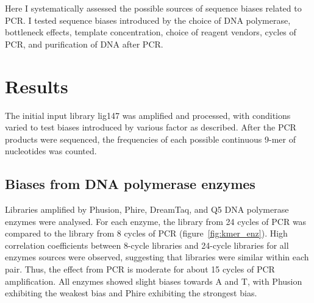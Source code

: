 \documentclass[a4paper, numbers=noenddot]{scrbook}
\begin{document}
Here I systematically assessed the possible sources of sequence biases related to PCR.  I tested sequence biases introduced by the choice of DNA polymerase, bottleneck effects, template concentration, choice of reagent vendors, cycles of PCR, and purification of DNA after PCR.

\section{Results}
\label{sec:pcrbias_results}

The initial input library lig147 was amplified and processed, with conditions varied to test biases introduced by various factor as described.  After the PCR products were sequenced, the frequencies of each possible continuous 9-mer of nucleotides was counted.

\subsection{Biases from DNA polymerase enzymes}
\label{ssec:pcrbias_result_enz}

Libraries amplified by Phusion, Phire, DreamTaq, and Q5 DNA polymerase enzymes were analysed.  For each enzyme, the library from 24 cycles of PCR was compared to the library from 8 cycles of PCR (figure~\ref{fig:kmer_enz}).  High correlation coefficients between 8-cycle libraries and 24-cycle libraries for all enzymes sources were observed, suggesting that libraries were similar within each pair.  Thus, the effect from PCR is moderate for about 15 cycles of PCR amplification.  All enzymes showed slight biases towards A and T, with Phusion exhibiting the weakest bias and Phire exhibiting the strongest bias.
\end{document}

